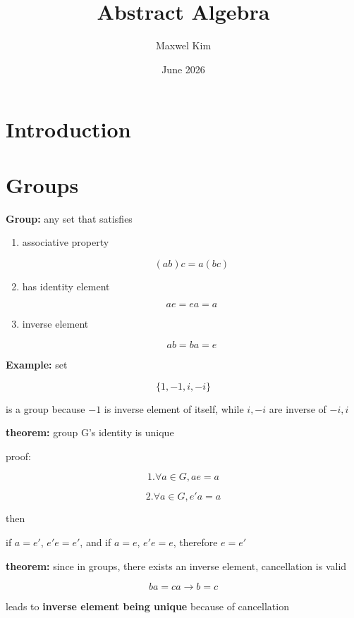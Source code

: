 \documentclass{article}
\title{Abstract Algebra}
\author{Maxwel Kim}
\date{June 2026}
\begin{document}
\maketitle

\section*{Introduction}



\section*{Groups}


\textbf{Group:} any set that satisfies \\

\begin{enumerate}
    \item associative property

    \[
    (ab)c=a(bc)
    \]

    \item has identity element

    \[
    ae=ea=a
    \]

    \item inverse element

    \[
    ab=ba=e
    \]
\end{enumerate}

\textbf{Example:} set 

\[
\{1,-1,i,-i\} 
\]

is a group because $-1$ is inverse element of itself, while $i,-i$ are inverse of $-i,i$


\textbf{theorem:}
group G's identity is unique

proof:

\[
1. \forall a \in G, ae=a
\]

\[
2.\forall a\in G, e'a=a
\]

then 

if $a=e'$, $e'e=e'$, and if $a=e$, $e'e=e$, therefore $e=e'$

\textbf{theorem:} since in groups, there exists an inverse element, cancellation is valid 

\[
ba=ca \rightarrow b=c
\]

leads to \textbf{inverse element being unique} because of cancellation
\end{document}

